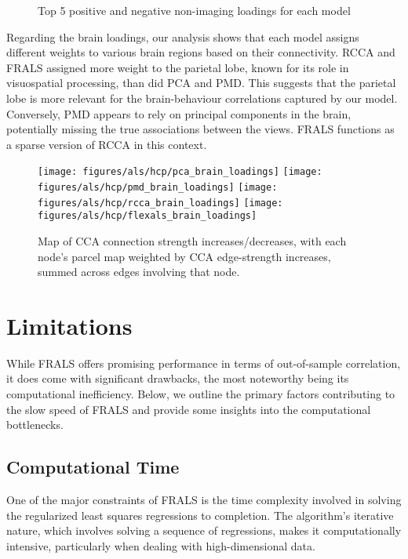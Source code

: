 \begin{figure}[h]
\centering

\caption*{Top 5 positive and negative non-imaging loadings for each model}
\label{fig:behaviour}
\end{figure}

Regarding the brain loadings, our analysis shows that each model assigns different weights to various brain regions
based on their connectivity.
RCCA and FRALS assigned more weight to the parietal lobe, known for its role in visuospatial processing, than did PCA and PMD. This suggests that the parietal lobe is more relevant for the brain-behaviour correlations captured by our model.
Conversely, PMD appears to rely on principal components in the brain, potentially missing the true associations between the views.
FRALS functions as a sparse version of RCCA in this context.

\begin{figure}[h]
\centering
\texttt{[image: figures/als/hcp/pca\_brain\_loadings]}
\texttt{[image: figures/als/hcp/pmd\_brain\_loadings]}
\texttt{[image: figures/als/hcp/rcca\_brain\_loadings]}
\texttt{[image: figures/als/hcp/flexals\_brain\_loadings]}
\caption*{Map of CCA connection strength increases/decreases, with each node’s parcel map weighted by CCA edge-strength increases, summed across edges involving that node.}
\label{fig:brain}
\end{figure}

\section{Limitations}\label{sec:limitations}

While FRALS offers promising performance in terms of out-of-sample correlation, it does come with significant drawbacks, the most noteworthy being its computational inefficiency. Below, we outline the primary factors contributing to the slow speed of FRALS and provide some insights into the computational bottlenecks.

\subsection{Computational Time}\label{subsec:computational-time}
One of the major constraints of FRALS is the time complexity involved in solving the regularized least squares regressions to completion. The algorithm’s iterative nature, which involves solving a sequence of regressions, makes it computationally intensive, particularly when dealing with high-dimensional data.

